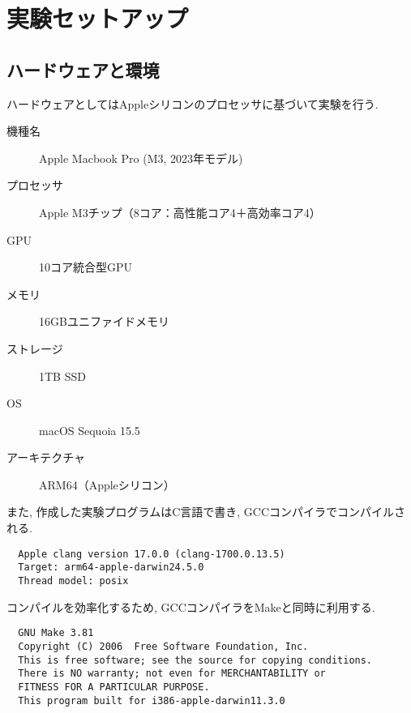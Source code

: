 \documentclass[a4j, 12pt]{jarticle}
\begin{document}
\section{実験セットアップ}
\subsection{ハードウェアと環境}
ハードウェアとしてはAppleシリコンのプロセッサに基づいて実験を行う. 
\begin{description}
  \item[機種名] Apple Macbook Pro (M3, 2023年モデル)
  \item[プロセッサ] Apple M3チップ（8コア：高性能コア4＋高効率コア4）
  \item[GPU] 10コア統合型GPU
  \item[メモリ] 16GBユニファイドメモリ
  \item[ストレージ] 1TB SSD
  \item[OS] macOS Sequoia 15.5
  \item[アーキテクチャ] ARM64（Appleシリコン） 
\end{description}
また, 作成した実験プログラムはC言語で書き, GCCコンパイラでコンパイルされる. 
\begin{verbatim}
  Apple clang version 17.0.0 (clang-1700.0.13.5)
  Target: arm64-apple-darwin24.5.0
  Thread model: posix
\end{verbatim}
コンパイルを効率化するため, GCCコンパイラをMakeと同時に利用する. 
\begin{verbatim}
  GNU Make 3.81
  Copyright (C) 2006  Free Software Foundation, Inc.
  This is free software; see the source for copying conditions.
  There is NO warranty; not even for MERCHANTABILITY or 
  FITNESS FOR A PARTICULAR PURPOSE.
  This program built for i386-apple-darwin11.3.0
\end{verbatim}
\end{document}
